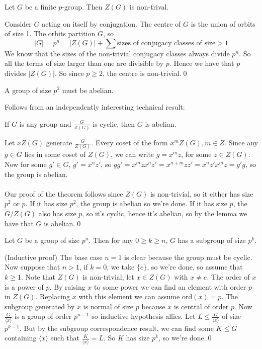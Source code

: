\documentclass{article}
\begin{document}
\begin{itemize}
\begin{theorem}
  Let $ G $ be a finite $ p $-group. Then $ Z(G) $ is non-trival.
\end{theorem}
\pf Consider $ G $ acting on itself by conjugation. The centre of $ G $ is the union of orbits of size 1. The orbits partition $ G $, so
\[
	|G|=p^n=|Z(G)|+\sum\text{sizes of conjugacy classes of size} > 1  
\]
We know that the sizes of the non-trivial conjugacy classes always divide $ p^n $. So all the terms of size larger than one are divisible by $ p $. Hence we have that $ p $ divides $ |Z(G)| $. So since $ p\ge 2 $, the centre is non-trivial.\qed
\begin{theorem}
  A group of size $ p^2 $ must be abelian.
\end{theorem}
\pf Follows from an independently interesting technical result:
\begin{lemma}
	If $ G $ is any group and $ \frac G{Z(G)} $ is cyclic, then $ G $ is abelian.
\end{lemma}
\pf Let $ xZ(G) $ generate $ \frac G{Z(G)} $. Every coset of the form $ x^mZ(G), m\in Z $. Since any $ g\in G $ lies in some coset of $ Z(G) $, we can write $ g=x^mz $, for some $ z\in Z(G) $. Now for some $ g'\in G $, $ g'=x^nz' $, so $ gg'=x^mzx^nz'=x^{n+m}zz'=x^nz'x^mz=g'g $, so the group is abelian.\\\\
Our proof of the theorem follows since $ Z(G) $ is non-trivial, so it either has size $ p^2 $ or $ p $. If it has size $ p^2 $, the group is abelian so we're done. If it has size $ p $, the $ G/Z(G) $ also has size $ p $, so it's cyclic, hence it's abelian, so by the lemma we have that $ G $ is abelian.\qed
\begin{theorem}
  Let $ G $ be a group of size $ p^n $. Then for any $ 0\ge k \ge n$, $ G $ has a subgroup of size $ p^k $.
\end{theorem}
\pf (Inductive proof) The base case $ n=1 $ is clear because the group must be cyclic. Now suppose that $ n>1 $, if $ k=0 $, we take $ \{e\} $, so we're done, so assume that $ k\ge 1 $.  Note that $ Z(G) $ is non-trivial, let $ x\in Z(G) $ with $ x\ne e $. The order of $ x $ is a power of $ p $. By raising $ x $ to some power we can find an element with order $ p $ in $ Z(G) $. Replacing $ x $ with this element we can assume $ \mathrm{ord}(x)=p $. The subgroup generated by $ x $ is normal of size $ p $ because $ x $ is central of order $ p $. Now $ \frac{G}{\langle x\rangle} $ is a group of order $ p^{n-1} $ so inductive hypothesis allies. Let $ L\le \frac{G}{\langle x\rangle} $ of size $ p^{k-1} $. But by the subgroup correspondence result, we can find some $ K\le G $ containing $ \langle x\rangle $ such that $ \frac K{\langle x\rangle}=L $. So $ K $ has size $ p^k	 $, so we're done.\qed


\end{itemize}
\end{document}

